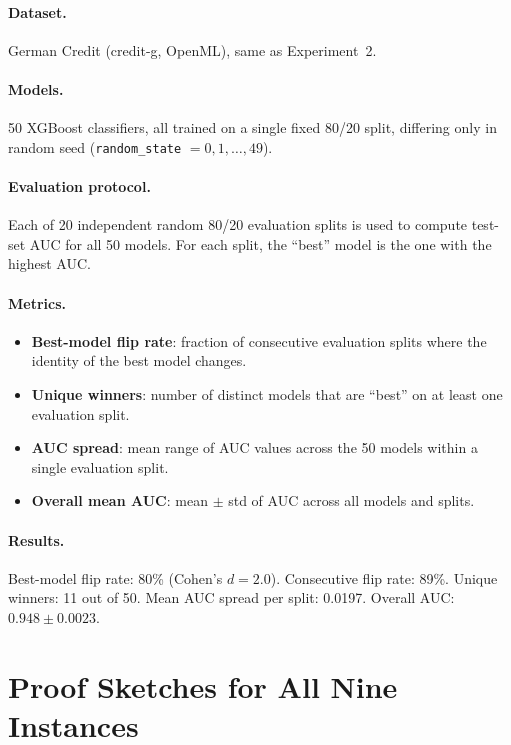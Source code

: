 \documentclass[11pt,a4paper]{article}
\begin{document}
\paragraph{Dataset.}
German Credit (credit-g, OpenML), same as Experiment~2.

\paragraph{Models.}
50 XGBoost classifiers, all trained on a single fixed 80/20 split, differing
only in random seed (\texttt{random\_state} $= 0, 1, \ldots, 49$).

\paragraph{Evaluation protocol.}
Each of 20 independent random 80/20 evaluation splits is used to compute
test-set AUC for all 50 models.  For each split, the ``best'' model is the
one with the highest AUC.

\paragraph{Metrics.}
\begin{itemize}[nosep]
  \item \textbf{Best-model flip rate}: fraction of consecutive evaluation
    splits where the identity of the best model changes.
  \item \textbf{Unique winners}: number of distinct models that are ``best''
    on at least one evaluation split.
  \item \textbf{AUC spread}: mean range of AUC values across the 50 models
    within a single evaluation split.
  \item \textbf{Overall mean AUC}: mean $\pm$ std of AUC across all
    models and splits.
\end{itemize}

\paragraph{Results.}
Best-model flip rate: 80\% (Cohen's $d = 2.0$).  Consecutive flip rate: 89\%.  Unique winners:
11 out of 50.  Mean AUC spread per split: 0.0197.  Overall AUC:
$0.948 \pm 0.0023$.

\section{Proof Sketches for All Nine Instances}
\label{app:proof-sketches}
\end{document}
